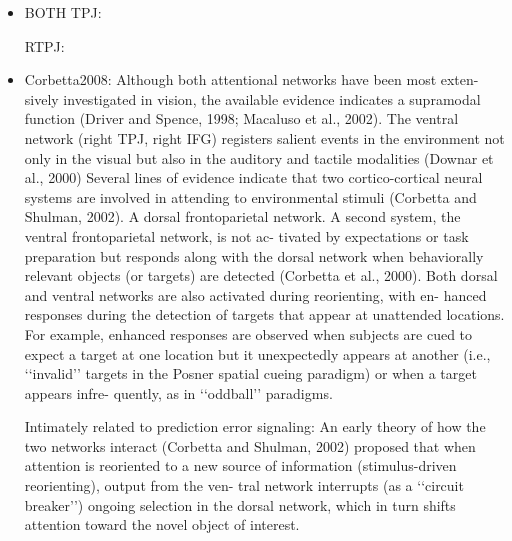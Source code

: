 \documentclass{article} %
\begin{document}
\begin{itemize}
\item
BOTH TPJ:


RTPJ:
\item
Corbetta2008:
Although both attentional networks have been most exten- sively investigated in vision, the available evidence indicates a supramodal function (Driver and Spence, 1998; Macaluso et al., 2002). The ventral network (right TPJ, right IFG) registers salient events in the environment not only in the visual but also in the auditory and tactile modalities (Downar et al., 2000)
Several lines of evidence indicate that two cortico-cortical neural systems are involved in attending to environmental stimuli (Corbetta and Shulman, 2002). A dorsal frontoparietal network. A second system, the ventral frontoparietal network, is not ac- tivated by expectations or task preparation but responds along with the dorsal network when behaviorally relevant objects (or targets) are detected (Corbetta et al., 2000). Both dorsal and ventral networks are also activated during reorienting, with en- hanced responses during the detection of targets that appear at unattended locations. For example, enhanced responses are observed when subjects are cued to expect a target at one location but it unexpectedly appears at another (i.e., ‘‘invalid’’ targets in the Posner spatial cueing paradigm)
or when a target appears infre- quently, as in ‘‘oddball’’ paradigms.

Intimately related to prediction error signaling:
An early theory of how the two networks interact (Corbetta and Shulman, 2002) proposed that when attention is reoriented to a new source 
of information (stimulus-driven reorienting), output from the ven- tral network interrupts (as a ‘‘circuit breaker’’) ongoing selection in the dorsal network, which in turn shifts attention toward the novel object of interest.


\end{itemize}
\end{document}
